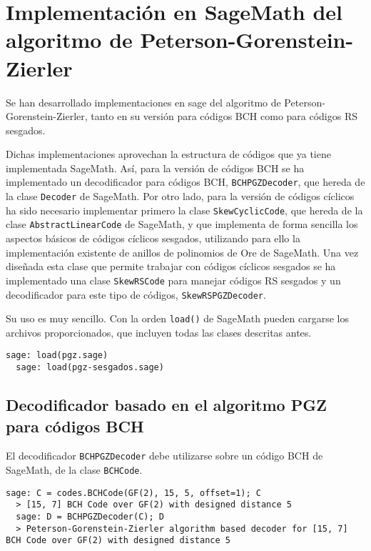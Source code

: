 \chapter[Implementación en SageMath del algoritmo PGZ]{Implementación en SageMath del algoritmo de Peterson-Gorenstein-Zierler}
\label{annex:pgz-sage}

Se han desarrollado implementaciones en sage del algoritmo de Peterson-Gorenstein-Zierler, tanto en su versión para códigos BCH como para códigos RS sesgados.

Dichas implementaciones aprovechan la estructura de códigos que ya tiene implementada SageMath.
Así, para la versión de códigos BCH se ha implementado un decodificador para códigos BCH, \texttt{BCHPGZDecoder}, que hereda de la clase \texttt{Decoder} de SageMath.
Por otro lado, para la versión de códigos cíclicos ha sido necesario implementar primero la clase \texttt{SkewCyclicCode}, que hereda de la clase \texttt{AbstractLinearCode} de SageMath, y que implementa de forma sencilla los aspectos básicos de códigos cíclicos sesgados, utilizando para ello la implementación existente de anillos de polinomios de Ore de SageMath.
Una vez diseñada esta clase que permite trabajar con códigos cíclicos sesgados se ha implementado una clase \texttt{SkewRSCode} para manejar códigos RS sesgados y un decodificador para este tipo de códigos, \texttt{SkewRSPGZDecoder}.

Su uso es muy sencillo.
Con la orden \texttt{load()} de SageMath pueden cargarse los archivos proporcionados, que incluyen todas las clases descritas antes.

\begin{lstlisting}[gobble=2]
  sage: load(pgz.sage)
  sage: load(pgz-sesgados.sage)
\end{lstlisting}

\section{Decodificador basado en el algoritmo PGZ para códigos BCH}

El decodificador \texttt{BCHPGZDecoder} debe utilizarse sobre un código BCH de SageMath, de la clase \texttt{BCHCode}.

\begin{lstlisting}[gobble=2]
  sage: C = codes.BCHCode(GF(2), 15, 5, offset=1); C
  > [15, 7] BCH Code over GF(2) with designed distance 5
  sage: D = BCHPGZDecoder(C); D
  > Peterson-Gorenstein-Zierler algorithm based decoder for [15, 7] BCH Code over GF(2) with designed distance 5
\end{lstlisting}

